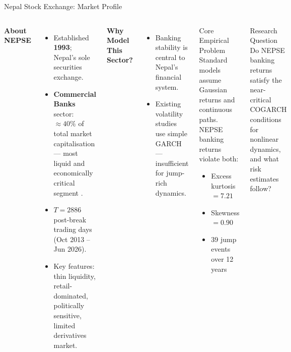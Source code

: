 \documentclass[10pt, aspectratio=169]{beamer}
\begin{document}
\begin{frame}{Nepal Stock Exchange: Market Profile}
\begin{columns}[T]
  \textbf{About NEPSE}
  \begin{itemize}\small
    \item Established \textbf{1993}; Nepal's sole securities exchange.
    \item \textbf{Commercial Banks} sector: $\approx\!40\%$ of total
          market capitalisation — most liquid and economically critical
          segment \cite{worldbank2020nepal}.
    \item $T=2886$ post-break trading days (Oct 2013 -- Jun 2026).
    \item Key features: thin liquidity, retail-dominated, politically
          sensitive, limited derivatives market.
  \end{itemize}
  \vspace{0.2cm}
  \textbf{Why Model This Sector?}
  \begin{itemize}\small
    \item Banking stability is central to Nepal's financial system.
    \item Existing volatility studies \cite{gajurel2021volatility} use
          simple GARCH — insufficient for jump-rich dynamics.
  \end{itemize}
  \begin{alertblock}{Core Empirical Problem}
    Standard models assume Gaussian returns and continuous paths.
    NEPSE banking returns violate both:
    \begin{itemize}\small
      \item Excess kurtosis $= 7.21$
      \item Skewness $= 0.90$
      \item 39 jump events over 12 years
    \end{itemize}
  \end{alertblock}
  \vspace{0.2cm}
  \begin{block}{Research Question}
    Do NEPSE banking returns satisfy the near-critical COGARCH
    conditions for nonlinear dynamics, and what risk
    estimates follow?
  \end{block}
\end{columns}
\end{frame}
\end{document}

